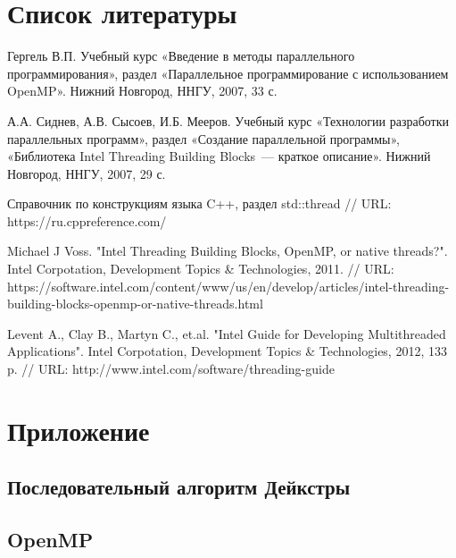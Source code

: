 \documentclass{article}
\begin{document}
\section{Список литературы}
\begin{enumerate}
 Гергель В.П. Учебный курс «Введение в методы параллельного программирования», раздел «Параллельное программирование с использованием OpenMP». Нижний Новгород, ННГУ, 2007, 33 с.

 А.А. Сиднев, А.В. Сысоев, И.Б. Мееров. Учебный курс «Технологии разработки параллельных программ», раздел «Создание параллельной программы», «Библиотека Intel Threading Building Blocks~--- краткое описание». Нижний Новгород, ННГУ, 2007, 29 с. 

 Справочник по конструкциям языка C++, раздел std::thread // URL: https://ru.cppreference.com/

 Michael J Voss. "Intel Threading Building Blocks, OpenMP, or native threads?". Intel Corpotation, Development Topics \& Technologies, 2011. // URL: \linebreak https://software.intel.com/content/www/us/en/develop/articles/intel-threading-building-blocks-openmp-or-native-threads.html

 Levent A., Clay B., Martyn C., et.al. "Intel Guide for Developing Multithreaded Applications". Intel Corpotation, Development Topics \& Technologies, 2012, 133 p. // URL: http://www.intel.com/software/threading-guide
\end{enumerate}

\newpage

\section{Приложение}
\subsection{Последовательный алгоритм Дейкстры}




\subsection{OpenMP}



\end{document}
